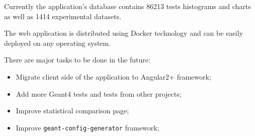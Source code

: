 Currently the application's database contains 86213 tests histograms and charts as well as 1414 experimental datasets.

The web application is distributed using Docker technology and can be easily deployed on any operating system.

There are major tasks to be done in the future:
\begin{itemize}
	\item Migrate client side of the application to Angular2+ framework;
	\item Add more Geant4 tests and tests from other projects;
	\item Improve statistical comparison page;
	\item Improve {\tt geant-config-generator} framework;
\end{itemize}